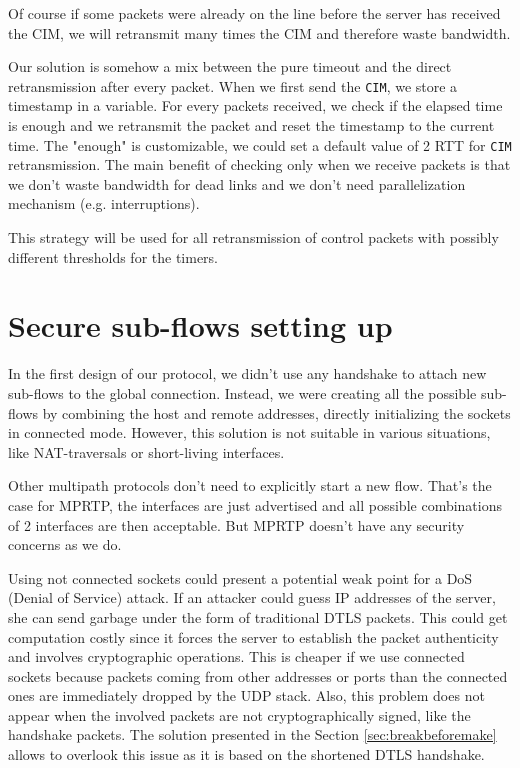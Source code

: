 Of course if some packets were already on the line before the server has received the CIM, we will retransmit many times the CIM and therefore waste bandwidth.

Our solution is somehow a mix between the pure timeout and the direct retransmission after every packet. When we first send the \texttt{CIM}, we store a timestamp in a variable. For every packets received, we check if the elapsed time is enough and we retransmit the packet and reset the timestamp to the current time. The "enough" is customizable, we could set a default value of 2 RTT for \texttt{CIM} retransmission. The main benefit of checking only when we receive packets is that we don't waste bandwidth for dead links and we don't need parallelization mechanism (e.g. interruptions).

This strategy will be used for all retransmission of control packets with possibly different thresholds for the timers.

\section{Secure sub-flows setting up}\label{sec:setupflow}

In the first design of our protocol, we didn't use any handshake to attach new sub-flows to the global connection. Instead, we were creating all the possible sub-flows by combining the host and remote addresses, directly initializing the sockets in connected mode. However, this solution is not suitable in various situations, like NAT-traversals or short-living interfaces. 

Other multipath protocols don't need to explicitly start a new flow. That's the case for MPRTP, the interfaces are just advertised and all possible combinations of 2 interfaces are then acceptable. But MPRTP doesn't have any security concerns as we do.

Using not connected sockets could present a potential weak point for a DoS (Denial of Service) attack. If an attacker could guess IP addresses of the server, she can send garbage under the form of traditional DTLS packets. This could get computation costly since it forces the server to establish the packet authenticity and involves cryptographic operations. This is cheaper if we use connected sockets because packets coming from other addresses or ports than the connected ones are immediately dropped by the UDP stack. Also, this problem does not appear when the involved packets are not cryptographically signed, like the handshake packets. The solution presented in the Section \ref{sec:breakbeforemake} allows to overlook this issue as it is based on the shortened DTLS handshake.


